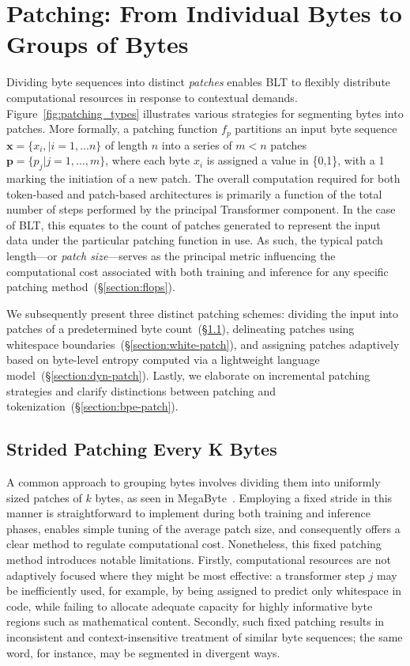 \section{Patching: From Individual Bytes to Groups of Bytes}
\label{section:patching}

Dividing byte sequences into distinct \textit{patches} enables {\textsc BLT} to flexibly distribute computational resources in response to contextual demands. Figure~\ref{fig:patching_types} illustrates various strategies for segmenting bytes into patches. More formally, a patching function $f_p$ partitions an input byte sequence $\pmb{x}=\{x_i,|i=1,\ldots n\}$ of length $n$ into a series of $m < n$ patches $\pmb{p}=\{p_j|j=1,\ldots,m\}$, where each byte $x_i$ is assigned a value in \{0,1\}, with a 1 marking the initiation of a new patch. The overall computation required for both token-based and patch-based architectures is primarily a function of the total number of steps performed by the principal Transformer component. In the case of {\textsc BLT}, this equates to the count of patches generated to represent the input data under the particular patching function in use. As such, the typical patch length—or \textit{patch size}—serves as the principal metric influencing the computational cost associated with both training and inference for any specific patching method~(\S\ref{section:flops}).

We subsequently present three distinct patching schemes: dividing the input into patches of a predetermined byte count~(\S\ref{section:static-patch}), delineating patches using whitespace boundaries~(\S\ref{section:white-patch}), and assigning patches adaptively based on byte-level entropy computed via a lightweight language model~(\S\ref{section:dyn-patch}). Lastly, we elaborate on incremental patching strategies and clarify distinctions between patching and tokenization~(\S\ref{section:bpe-patch}).

\subsection{Strided Patching Every K Bytes}
\label{section:static-patch}

A common approach to grouping bytes involves dividing them into uniformly sized patches of $k$ bytes, as seen in MegaByte~\citep{yu2023megabyte}. Employing a fixed stride in this manner is straightforward to implement during both training and inference phases, enables simple tuning of the average patch size, and consequently offers a clear method to regulate computational cost. Nonetheless, this fixed patching method introduces notable limitations. Firstly, computational resources are not adaptively focused where they might be most effective: a transformer step $j$ may be inefficiently used, for example, by being assigned to predict only whitespace in code, while failing to allocate adequate capacity for highly informative byte regions such as mathematical content. Secondly, such fixed patching results in inconsistent and context-insensitive treatment of similar byte sequences; the same word, for instance, may be segmented in divergent ways.

